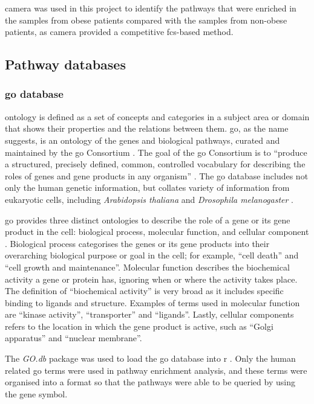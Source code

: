 \gls{camera} was used in this project to identify the pathways that were enriched in the samples from obese patients compared with the samples from non-obese patients, as \gls{camera} provided a competitive \gls{fcs}-based method.

\subsection{Pathway databases}
\label{sub:pathway_databases}

\subsubsection{\gls{go} database}
\label{ssub:go_database}

\Gls{ontology} is defined as a set of concepts and categories in a subject area or domain that shows their properties and the relations between them.
\Acrfull{go}, as the name suggests, is an \gls{ontology} of the genes and biological pathways, curated and maintained by the \gls{go} Consortium \citep{GO2000,GO2004}.
The goal of the \gls{go} Consortium is to ``produce a structured, precisely defined, common, controlled vocabulary for describing the roles of genes and gene products in any organism'' \citep{GO2000}.
The \gls{go} database includes not only the human genetic information, but collates variety of information from eukaryotic cells, including \textit{Arabidopsis thaliana} and \textit{Drosophila melanogaster} \citep{GO2000,GO2004}.

\gls{go} provides three distinct ontologies to describe the role of a gene or its gene product in the cell: biological process, molecular function, and cellular component \citep{GO2000}.
Biological process categorises the genes or its gene products into their overarching biological purpose or goal in the cell; for example, ``cell death'' and ``cell growth and maintenance''.
Molecular function describes the biochemical activity a gene or protein has, ignoring when or where the activity takes place.
The definition of ``biochemical activity'' is very broad as it includes specific binding to ligands and structure.
Examples of terms used in molecular function are ``kinase activity'', ``transporter'' and ``ligands''.
Lastly, cellular components refers to the location in which the gene product is active, such as ``Golgi apparatus'' and ``nuclear membrane''.

The \textit{GO.db} package was used to load the \gls{go} database into \gls{r} \citep{Carlson2016}.
Only the human related \gls{go} terms were used in pathway enrichment analysis, and these terms were organised into a format so that the pathways were able to be queried by using the gene symbol.

